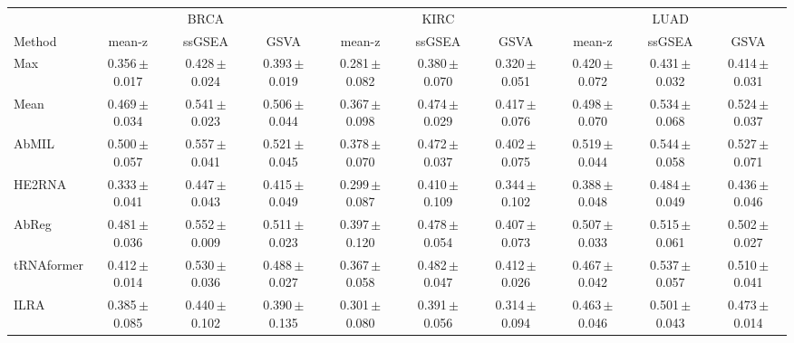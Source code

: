 \begin{tabular}{lccccccccc}
\toprule
& \multicolumn{3}{c}{BRCA} & \multicolumn{3}{c}{KIRC} & \multicolumn{3}{c}{LUAD}\\
\cmidrule(lr){2-4}\cmidrule(lr){5-7}\cmidrule(lr){8-10}
Method & mean-z & ssGSEA & GSVA & mean-z & ssGSEA & GSVA & mean-z & ssGSEA & GSVA\\
\midrule
Max & 0.356\,{\tiny$\pm$0.017} & 0.428\,{\tiny$\pm$0.024} & 0.393\,{\tiny$\pm$0.019} & 0.281\,{\tiny$\pm$0.082} & 0.380\,{\tiny$\pm$0.070} & 0.320\,{\tiny$\pm$0.051} & 0.420\,{\tiny$\pm$0.072} & 0.431\,{\tiny$\pm$0.032} & 0.414\,{\tiny$\pm$0.031}\\
Mean & 0.469\,{\tiny$\pm$0.034} & 0.541\,{\tiny$\pm$0.023} & 0.506\,{\tiny$\pm$0.044} & 0.367\,{\tiny$\pm$0.098} & 0.474\,{\tiny$\pm$0.029} & 0.417\,{\tiny$\pm$0.076} & 0.498\,{\tiny$\pm$0.070} & 0.534\,{\tiny$\pm$0.068} & 0.524\,{\tiny$\pm$0.037}\\
AbMIL & 0.500\,{\tiny$\pm$0.057} & 0.557\,{\tiny$\pm$0.041} & 0.521\,{\tiny$\pm$0.045} & 0.378\,{\tiny$\pm$0.070} & 0.472\,{\tiny$\pm$0.037} & 0.402\,{\tiny$\pm$0.075} & 0.519\,{\tiny$\pm$0.044} & 0.544\,{\tiny$\pm$0.058} & 0.527\,{\tiny$\pm$0.071}\\
HE2RNA & 0.333\,{\tiny$\pm$0.041} & 0.447\,{\tiny$\pm$0.043} & 0.415\,{\tiny$\pm$0.049} & 0.299\,{\tiny$\pm$0.087} & 0.410\,{\tiny$\pm$0.109} & 0.344\,{\tiny$\pm$0.102} & 0.388\,{\tiny$\pm$0.048} & 0.484\,{\tiny$\pm$0.049} & 0.436\,{\tiny$\pm$0.046}\\
AbReg & 0.481\,{\tiny$\pm$0.036} & 0.552\,{\tiny$\pm$0.009} & 0.511\,{\tiny$\pm$0.023} & 0.397\,{\tiny$\pm$0.120} & 0.478\,{\tiny$\pm$0.054} & 0.407\,{\tiny$\pm$0.073} & 0.507\,{\tiny$\pm$0.033} & 0.515\,{\tiny$\pm$0.061} & 0.502\,{\tiny$\pm$0.027}\\
tRNAformer & 0.412\,{\tiny$\pm$0.014} & 0.530\,{\tiny$\pm$0.036} & 0.488\,{\tiny$\pm$0.027} & 0.367\,{\tiny$\pm$0.058} & 0.482\,{\tiny$\pm$0.047} & 0.412\,{\tiny$\pm$0.026} & 0.467\,{\tiny$\pm$0.042} & 0.537\,{\tiny$\pm$0.057} & 0.510\,{\tiny$\pm$0.041}\\
ILRA & 0.385\,{\tiny$\pm$0.085} & 0.440\,{\tiny$\pm$0.102} & 0.390\,{\tiny$\pm$0.135} & 0.301\,{\tiny$\pm$0.080} & 0.391\,{\tiny$\pm$0.056} & 0.314\,{\tiny$\pm$0.094} & 0.463\,{\tiny$\pm$0.046} & 0.501\,{\tiny$\pm$0.043} & 0.473\,{\tiny$\pm$0.014}\\

\end{tabular}
